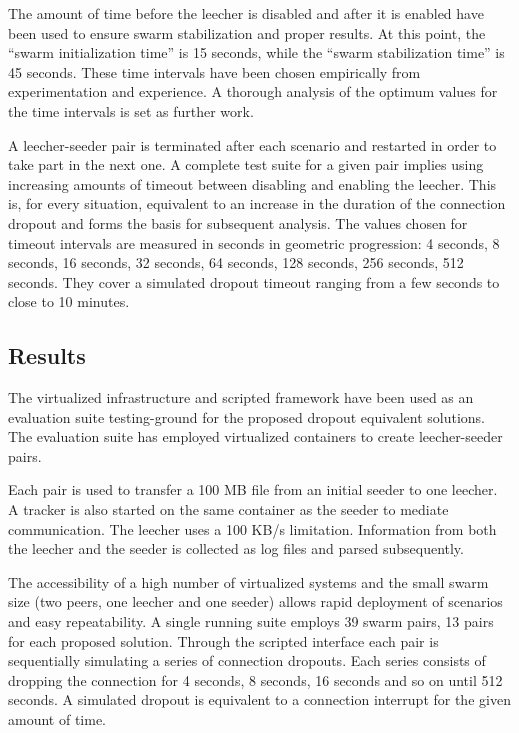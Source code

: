 The amount of time before the leecher is disabled and after it is enabled
have been used to ensure swarm stabilization and proper results. At this
point, the ``swarm initialization time'' is 15 seconds, while the ``swarm
stabilization time'' is 45 seconds. These time intervals have been chosen
empirically from experimentation and experience. A thorough analysis of the
optimum values for the time intervals is set as further work.

A leecher-seeder pair is terminated after each scenario and restarted in order
to take part in the next one. A complete test suite for a given pair implies
using increasing amounts of timeout between disabling and enabling the
leecher. This is, for every situation, equivalent to an increase in the
duration of the connection dropout and forms the basis for subsequent
analysis. The values chosen for timeout intervals are measured in seconds in
geometric progression: 4 seconds, 8 seconds, 16 seconds, 32 seconds, 64
seconds, 128 seconds, 256 seconds, 512 seconds. They cover a simulated dropout
timeout ranging from a few seconds to close to 10 minutes.

\subsection{Results}
\label{subsec:virt-infra:results-dropouts}

The virtualized infrastructure and scripted framework have been used as an
evaluation suite testing-ground for the proposed dropout equivalent solutions.
The evaluation suite has employed virtualized containers to create
leecher-seeder pairs.

Each pair is used to transfer a 100 MB file from an initial seeder to one
leecher. A tracker is also started on the same container as the seeder to
mediate communication. The leecher uses a 100 KB/s limitation. Information
from both the leecher and the seeder is collected as log files and parsed
subsequently.

The accessibility of a high number of virtualized systems and the small swarm
size (two peers, one leecher and one seeder) allows rapid deployment of
scenarios and easy repeatability. A single running suite employs 39 swarm
pairs, 13 pairs for each proposed solution. Through the scripted interface
each pair is sequentially simulating a series of connection dropouts. Each
series consists of dropping the connection for 4 seconds, 8 seconds, 16
seconds and so on until 512 seconds. A simulated dropout is equivalent to a
connection interrupt for the given amount of time.


